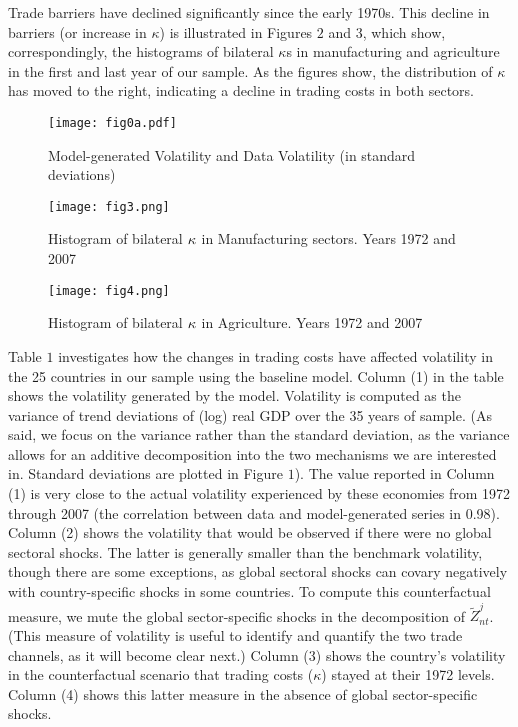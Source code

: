 \documentclass[12pt]{article}
\begin{document}
Trade barriers have declined significantly since the early 1970s. This
decline in barriers (or increase in $\kappa $) is illustrated in Figures $2$
and $3$, which show, correspondingly, the histograms of bilateral $\kappa $s
in manufacturing and agriculture in the first and last year of our sample.
As the figures show, the distribution of $\kappa $ has moved to the right,
indicating a decline in trading costs in both sectors.

\medskip 

\begin{figure}[h]
\caption{Model-generated Volatility and Data Volatility (in standard
deviations)}\centering\texttt{[image: fig0a.pdf]}
\end{figure}
\medskip 
\begin{figure}[h]
\caption{Histogram of bilateral $\protect\kappa $ in Manufacturing sectors.
Years 1972 and 2007}\centering\texttt{[image: fig3.png]}
\end{figure}

\begin{figure}[h]
\caption{Histogram of bilateral $\protect\kappa $ in Agriculture. Years 1972
and 2007}\centering\texttt{[image: fig4.png]}
\end{figure}

Table $1$ investigates how the changes in trading costs have affected
volatility in the 25 countries in our sample using the baseline model.
Column (1) in the table shows the volatility generated by the model.
Volatility is computed as the variance of trend deviations of (log) real GDP
over the 35 years of sample. (As said, we focus on the variance rather than
the standard deviation, as the variance allows for an additive decomposition
into the two mechanisms we are interested in. Standard deviations are
plotted in Figure $1$). The value reported in Column (1) is very close to
the actual volatility experienced by these economies from 1972 through 2007
(the correlation between data and model-generated series in 0.98). Column
(2) shows the volatility that would be observed if there were no global
sectoral shocks. The latter is generally smaller than the benchmark
volatility, though there are some exceptions, as global sectoral shocks can
covary negatively with country-specific shocks in some countries. To compute
this counterfactual measure, we mute the global sector-specific shocks in
the decomposition of $\tilde{Z}_{nt}^{j}$. (This measure of volatility is
useful to identify and quantify the two trade channels, as it will become
clear next.) Column (3) shows the country's volatility in the counterfactual
scenario that trading costs ($\kappa $) stayed at their 1972 levels. Column
(4) shows this latter measure in the absence of global sector-specific
shocks.
\end{document}
